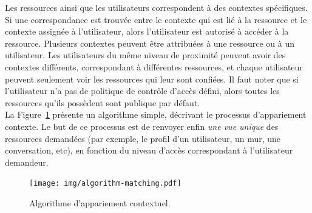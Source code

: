 Les ressources ainsi que les utilisateurs correspondent à des contextes spécifiques. Si une correspondance est trouvée entre le contexte qui est lié à la ressource et le contexte assignée à l'utilisateur, alors l'utilisateur est autorisé à accéder à la ressource. Plusieurs contextes peuvent être attribuées à une ressource ou à un utilisateur. Les utilisateurs du même niveau de proximité peuvent avoir des contextes différents, correspondant à différentes ressources, et chaque utilisateur peuvent seulement voir les ressources qui leur sont confiées. Il faut noter que si l'utilisateur n'a pas de politique de contrôle d'accès défini, alors toutes les ressources qu'ils possèdent sont publique par défaut.\\


La Figure~\ref{fig:context_matching_fr} présente un algorithme simple, décrivant le processus d'appariement contexte. Le but de ce processus est de renvoyer enfin \textit{une vue unique} des ressources demandées (par exemple, le profil d'un utilisateur, un mur, une conversation, etc), en fonction du niveau d'accès correspondant à l'utilisateur demandeur.\\

\begin{figure}[h]
  \begin{center}
    \texttt{[image: img/algorithm-matching.pdf]}
        \caption{Algorithme d'appariement contextuel.}
        \label{fig:context_matching_fr}
  \end{center}
\end{figure}

